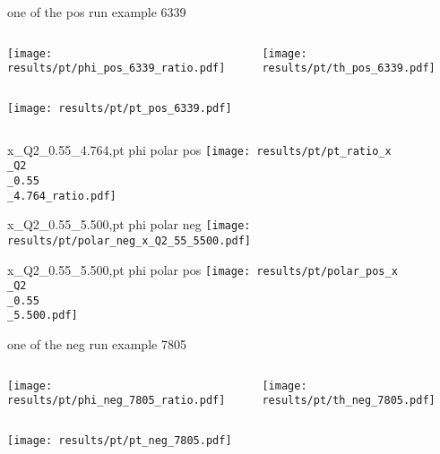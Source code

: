 \begin{frame}{one of the pos run example 6339}
\begin{columns}
\begin{column}[T]{0.5\textwidth}
\texttt{[image: results/pt/phi\_pos\_6339\_ratio.pdf]}
\end{column}
\begin{column}[T]{0.5\textwidth}
\texttt{[image: results/pt/th\_pos\_6339.pdf]}
\end{column}
\end{columns}
\begin{columns}
\begin{column}[T]{0.5\textwidth}
\texttt{[image: results/pt/pt\_pos\_6339.pdf]}
\end{column}
\begin{column}[T]{0.5\textwidth}
\end{column}
\end{columns}
\end{frame}
\begin{frame}{x\_Q2\_0.55\_4.764,pt phi polar pos}
\texttt{[image: results/pt/pt\_ratio\_x\\\_Q2\\\_0.55\\\_4.764\_ratio.pdf]}
\end{frame}
\begin{frame}{x\_Q2\_0.55\_5.500,pt phi polar neg}
\texttt{[image: results/pt/polar\_neg\_x\_Q2\_55\_5500.pdf]}
\end{frame}
\begin{frame}{x\_Q2\_0.55\_5.500,pt phi polar pos}
\texttt{[image: results/pt/polar\_pos\_x\\\_Q2\\\_0.55\\\_5.500.pdf]}
\end{frame}
\begin{frame}{one of the neg run example 7805}
\begin{columns}
\begin{column}[T]{0.5\textwidth}
\texttt{[image: results/pt/phi\_neg\_7805\_ratio.pdf]}
\end{column}
\begin{column}[T]{0.5\textwidth}
\texttt{[image: results/pt/th\_neg\_7805.pdf]}
\end{column}
\end{columns}
\texttt{[image: results/pt/pt\_neg\_7805.pdf]}
\end{frame}

